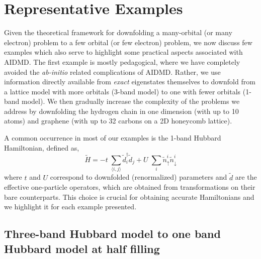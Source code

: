 \section{Representative Examples}

Given the theoretical framework for downfolding a many-orbital (or many electron) problem to a 
few orbital (or few electron) problem, we now discuss few examples which also serve to highlight some practical aspects 
associated with AIDMD. The first example is mostly pedagogical, 
where we have completely avoided the \textit{ab-initio} related complications of AIDMD. Rather, we use information directly available 
from \textit{exact} eigenstates themselves to downfold from a lattice model with more orbitals (3-band model) 
to one with fewer orbitals (1-band model). We then gradually increase the complexity of the problems we address 
by downfolding the hydrogen chain in one dimension (with up to 10 atoms) and graphene 
(with up to 32 carbons on a 2D honeycomb lattice). 

A common occurrence in most of our examples is the 1-band Hubbard Hamiltonian, defined as,
\begin{equation}
	\tilde{H} = -t \;\sum_{\langle i,j \rangle} \tilde{d}_i^{\dagger} \tilde{d}_j + U \;\sum_{i} \tilde{n}^{i}_{\uparrow} \tilde{n}^{i}_{\downarrow}
\label{eq:oneband}
\end{equation}
where $t$ and $U$ correspond to downfolded (renormalized) parameters and $\tilde{d}$ are the effective one-particle operators, 
which are obtained from transformations on their bare counterparts. 
This choice is crucial for obtaining accurate Hamiltonians and we highlight it for each example presented.   

\subsection{Three-band Hubbard model to one band Hubbard model at half filling}


